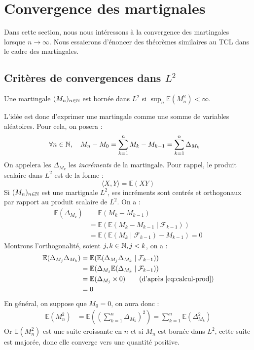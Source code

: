 \section{Convergence des martignales}

Dans cette section, nous nous intéressons à la convergence des martingales 
lorsque $n \to \infty$. Nous essaierons d'énoncer des théorèmes similaires au TCL 
dans le cadre des martingales. 

\subsection{Critères de convergences dans $L^2$}

\begin{rappel}
    Une martingale $(M_n)_{n \in \mathbb{N}}$ est bornée dans $L^2$ si $\sup_n \mathbb{E}(M_n^2) < \infty$.
\end{rappel}

L'idée est donc d'exprimer une martingale comme une somme de variables 
aléatoires. Pour cela, on posera : 
    \begin{align*}
        \forall n \in \mathbb{N}, \quad M_n - M_0 &= \sum_{k=1}^{n} M_k - M_{k-1} = \sum_{k=1}^{n} \Delta_{M_k}
    \end{align*}
On appelera les $\Delta_{M_k}$ les \emph{incréments} de la martingale.
Pour rappel, le produit scalaire dans $L^2$ est de la forme : 
    $$ \langle X,Y \rangle = \mathbb{E}(XY) $$ 
Si $(M_n)_{n \in \mathbb{N}}$ est une martignale $L^2$, ses incréments sont centrés et orthogonaux 
par rapport au produit scalaire de $L^2$. On a :
    \begin{align}
        \mathbb{E}( \Delta_{M_k}) &= \mathbb{E}(M_k - M_{k-1}) \\ 
        &= \mathbb{E}( \mathbb{E}( M_k - M_{k-1} \mid \mathcal{F}_{k-1})) \\ 
        &= \mathbb{E}( \mathbb{E}(M_k \mid \mathcal{F}_{k-1}) - M_{k-1}) = 0 \label{eq:calcul-prod}
    \end{align}
Montrons l'orthogonalité, soient $j,k \in \mathbb{N}, j < k$, on a : 
    \begin{align*}
        \mathbb{E}( \Delta_{M_j} \Delta_{M_k}) &= \mathbb{E}( \mathbb{E}( \Delta_{M_j} \Delta_{M_k} \mid \mathcal{F}_{k-1})) \\ 
        &= \mathbb{E}( \Delta_{M_j} \mathbb{E}( \Delta_{M_k} \mid \mathcal{F}_{k-1})) \\ 
        &= \mathbb{E}( \Delta_{M_j} \times 0) \quad \quad \text{(d'après \ref{eq:calcul-prod})} \\
        &= 0 
    \end{align*}
En général, on suppose que $M_0 = 0$, on aura donc : 
    \begin{align*}
        \mathbb{E}(M_n^2) &= \mathbb{E} \left( \left( \sum_{k=1}^{n} \Delta_{M_k}\right)^2 \right) = \sum_{k=1}^{n} \mathbb{E} \left( \Delta_{M_k}^2\right)
    \end{align*}
Or $ \mathbb{E}(M_n^2)$ est une suite croissante en $n$ et si $M_n$ est bornée dans $L^2$, 
cette suite est majorée, donc elle converge vers une quantité positive. 


